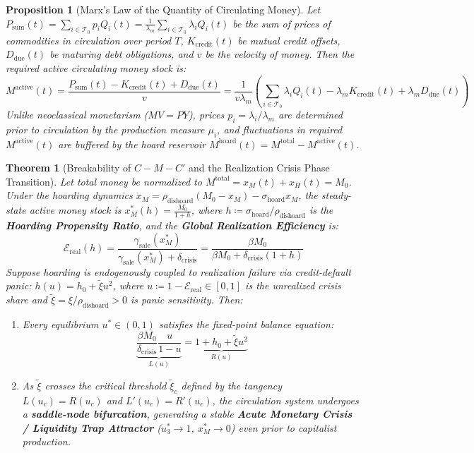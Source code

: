 \documentclass[11pt,a4paper]{article}
\newtheorem{proposition}{Proposition}[section]
\newtheorem{theorem}{Theorem}[section]
\begin{document}
\begin{proposition}[Marx's Law of the Quantity of Circulating Money]
Let $P_{\text{sum}}(t) = \sum_{i \in \mathcal{T}_0} p_i Q_i(t) = \frac{1}{\lambda_m} \sum_{i \in \mathcal{T}_0} \lambda_i Q_i(t)$ be the sum of prices of commodities in circulation over period $T$, $K_{\text{credit}}(t)$ be mutual credit offsets, $D_{\text{due}}(t)$ be maturing debt obligations, and $v$ be the velocity of money. Then the required active circulating money stock is:
\begin{equation}
    M^{\text{active}}(t) = \frac{P_{\text{sum}}(t) - K_{\text{credit}}(t) + D_{\text{due}}(t)}{v} = \frac{1}{v \lambda_m} \left( \sum_{i \in \mathcal{T}_0} \lambda_i Q_i(t) - \lambda_m K_{\text{credit}}(t) + \lambda_m D_{\text{due}}(t) \right)
\end{equation}
Unlike neoclassical monetarism ($MV = PY$), prices $p_i = \lambda_i / \lambda_m$ are determined prior to circulation by the production measure $\mu_i$, and fluctuations in required $M^{\text{active}}(t)$ are buffered by the hoard reservoir $M^{\text{hoard}}(t) = M^{\text{total}} - M^{\text{active}}(t)$.
\end{proposition}

\begin{theorem}[Breakability of $C - M - C'$ and the Realization Crisis Phase Transition]
Let total money be normalized to $M^{\text{total}} = x_M(t) + x_H(t) = M_0$. Under the hoarding dynamics $\dot{x}_M = \rho_{\text{dishoard}}(M_0 - x_M) - \sigma_{\text{hoard}} x_M$, the steady-state active money stock is $x_M^*(h) = \frac{M_0}{1 + h}$, where $h \coloneqq \sigma_{\text{hoard}} / \rho_{\text{dishoard}}$ is the \textbf{Hoarding Propensity Ratio}, and the \textbf{Global Realization Efficiency} is:
\begin{equation}
    \mathcal{E}_{\text{real}}(h) = \frac{\gamma_{\text{sale}}(x_M^*)}{\gamma_{\text{sale}}(x_M^*) + \delta_{\text{crisis}}} = \frac{\beta M_0}{\beta M_0 + \delta_{\text{crisis}}(1 + h)}
\end{equation}
Suppose hoarding is endogenously coupled to realization failure via credit-default panic: $h(u) = h_0 + \tilde{\xi} u^2$, where $u \coloneqq 1 - \mathcal{E}_{\text{real}} \in [0, 1]$ is the unrealized crisis share and $\tilde{\xi} = \xi / \rho_{\text{dishoard}} > 0$ is panic sensitivity. Then:
\begin{enumerate}[label=(\roman*)]
    \item Every equilibrium $u^* \in (0, 1)$ satisfies the fixed-point balance equation:
    \begin{equation}
        \underbrace{\frac{\beta M_0}{\delta_{\text{crisis}}} \frac{u}{1 - u}}_{L(u)} = \underbrace{1 + h_0 + \tilde{\xi} u^2}_{R(u)}
    \end{equation}
    \item As $\tilde{\xi}$ crosses the critical threshold $\tilde{\xi}_c$ defined by the tangency $L(u_c) = R(u_c)$ and $L'(u_c) = R'(u_c)$, the circulation system undergoes a \textbf{saddle-node bifurcation}, generating a stable \textbf{Acute Monetary Crisis / Liquidity Trap Attractor} ($u_3^* \to 1$, $x_M^* \to 0$) even prior to capitalist production.
\end{enumerate}
\end{theorem}
\end{document}
